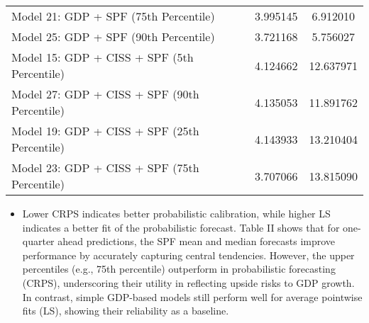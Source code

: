 \documentclass{article}
\begin{document}
\begin{table}[h!]
\begin{adjustbox}{width=\textwidth}
\begin{tabular}{l S[table-format=2.6] S[table-format=2.6]}
        Model 21: GDP + SPF (75th Percentile) & 3.995145 & 6.912010 \\
        Model 25: GDP + SPF (90th Percentile) & 3.721168 & 5.756027 \\
        Model 15: GDP + CISS + SPF (5th Percentile) & 4.124662 & 12.637971 \\
        Model 27: GDP + CISS + SPF (90th Percentile) & 4.135053 & 11.891762 \\
        Model 19: GDP + CISS + SPF (25th Percentile) & 4.143933 & 13.210404 \\
        Model 23: GDP + CISS + SPF (75th Percentile) & 3.707066 & 13.815090 \\
        \bottomrule
    \end{tabular}
    \end{adjustbox}
    \label{tab:model_comparison_sorted}
\end{table}


\begin{itemize}
    \item Lower CRPS indicates better probabilistic calibration, while higher LS indicates a better fit of the probabilistic forecast. Table II shows that for one-quarter ahead predictions, the SPF mean and median forecasts improve performance by accurately capturing central tendencies. However, the upper percentiles (e.g., 75th percentile) outperform in probabilistic forecasting (CRPS), underscoring their utility in reflecting upside risks to GDP growth. In contrast, simple GDP-based models still perform well for average pointwise fits (LS), showing their reliability as a baseline.
\end{itemize}

\pagebreak
\end{document}
